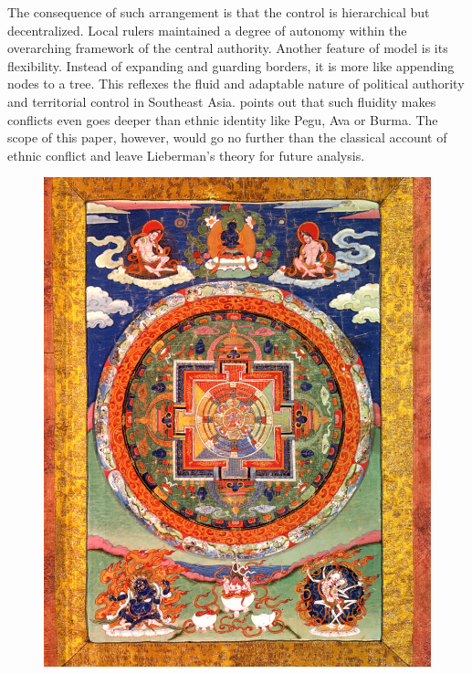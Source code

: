 \documentclass{article}
\begin{document}
The consequence of such arrangement is that the control is hierarchical but decentralized. Local rulers maintained a degree of autonomy within the overarching framework of the central authority. Another feature of model is its flexibility. Instead of expanding and guarding borders, it is more like appending nodes to a tree. This reflexes the fluid and adaptable nature of political authority and territorial control in Southeast Asia. \textcite{liebermanEthnicPoliticsEighteenthCentury1978} points out that such fluidity makes conflicts even goes deeper than ethnic identity like Pegu, Ava or Burma. The scope of this paper, however, would go no further than the classical account of ethnic conflict and leave Lieberman's theory for future analysis.

\begin{figure}[H]
        \centering
        \includegraphics[width=\textwidth]{mandala.png}
        \caption{\cite{MandalaBuddhistDeity1700}}
        \label{mandala}
\end{figure}
\end{document}
